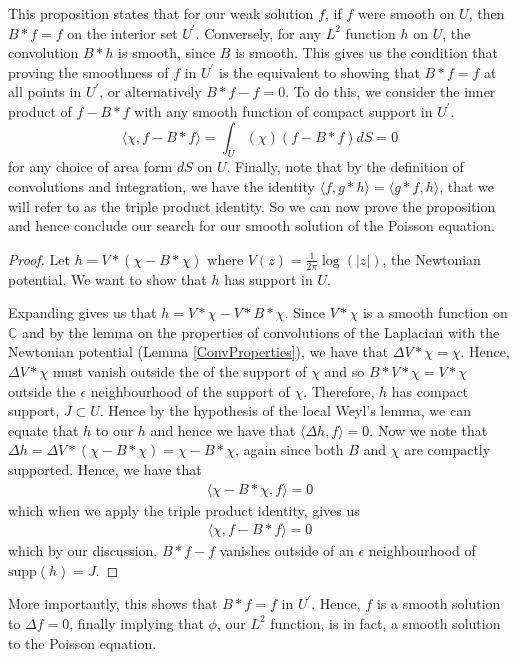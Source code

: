 \documentclass[11pt]{report}
\theoremstyle{definition}
\begin{document}
This proposition states that for our weak solution $f$, if $f$ were smooth on $U$, then $B*f = f$ on the interior set $U^{\prime}$. Conversely, for any $L^2$ function $h$ on $U$, the convolution $B*h$ is smooth, since $B$ is smooth. This gives us the condition that proving the smoothness of $f$ in $U^{\prime}$ is the equivalent to showing that $B*f = f$ at all points in $U^{\prime}$, or alternatively $B*f - f = 0$. To do this, we consider the inner product of $f-B*f$ with any smooth function of compact support in $U^{\prime}$. \[\langle \chi, f-B*f\rangle = \int_U (\chi)(f-B*f)dS = 0 \] for any choice of area form $dS$ on $U$. Finally, note that by the definition of convolutions and integration, we have the identity $\langle f, g*h \rangle = \langle g*f, h \rangle$, that we will refer to as the triple product identity.
So we can now prove the proposition and hence conclude our search for our smooth solution of the Poisson equation.
\begin{proof}
  Let $h = V*(\chi-B*\chi)$ where $V(z) = \frac{1}{2\pi}\log(|z|)$, the Newtonian potential. We want to show that $h$ has support in $U$.
  
  Expanding gives us that $h = V*\chi - V*B*\chi$. Since $V*\chi$ is a smooth function on $\mathbb{C}$ and by the lemma on the properties of convolutions of the Laplacian with the Newtonian potential (Lemma \ref{ConvProperties}), we have that $\Delta V*\chi = \chi$. Hence, $\Delta V*\chi$ must vanish outside the of the support of $\chi$ and so $B*V*\chi = V*\chi$ outside the $\epsilon$ neighbourhood of the support of $\chi$. Therefore, $h$ has compact support, $J \subset U$. Hence by the hypothesis of the local Weyl's lemma, we can equate that $h$ to our $h$ and hence we have that $\langle \Delta h, f\rangle = 0$. Now we note that $\Delta h = \Delta V*(\chi - B*\chi) = \chi - B*\chi$, again since both $B$ and $\chi$ are compactly supported. Hence, we have that 
  \begin{align*}
    \langle \chi - B*\chi, f \rangle = 0 
  \end{align*}
  which when we apply the triple product identity, gives us 
  \begin{align*}
    \langle \chi, f - B*f \rangle = 0 
  \end{align*}
  which by our discussion, $B*f-f$ vanishes outside of an $\epsilon$ neighbourhood of $\text{supp}(h)=J$.
\end{proof}
More importantly, this shows that $B*f = f$ in $U^{\prime}$. Hence, $f$ is a smooth solution to $\Delta f = 0$, finally implying that $\phi$, our $L^2$ function, is in fact, a smooth solution to the Poisson equation.
\end{document}
